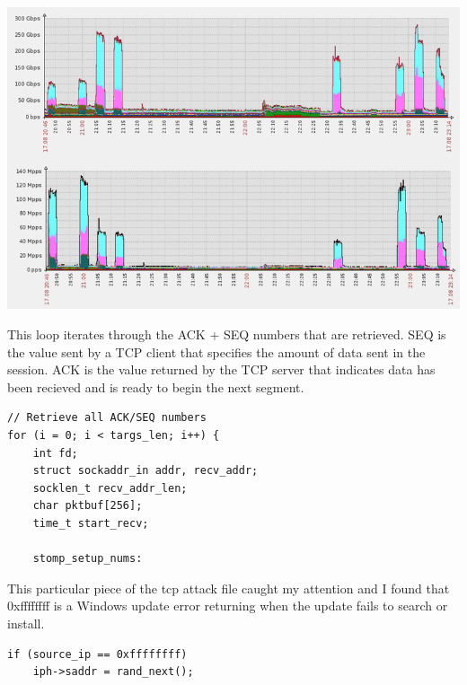 \documentclass[12pt, letterpaper]{article}
\begin{document}
\begin{sloppypar}
\begin{flushleft}
\begin{center}
{\includegraphics[width=1.0\textwidth]{mirai-bandwidth.png}}
\end{center}

This loop iterates through the ACK + SEQ numbers that are retrieved. SEQ is the value
sent by a TCP client that specifies the amount of data sent in the session. ACK is the 
value returned by the TCP server that indicates data has been recieved and is ready to
begin the next segment. 

\begin{lstlisting}
// Retrieve all ACK/SEQ numbers
for (i = 0; i < targs_len; i++) {
    int fd;
    struct sockaddr_in addr, recv_addr;
    socklen_t recv_addr_len;
    char pktbuf[256];
    time_t start_recv;

    stomp_setup_nums:
\end{lstlisting}

This particular piece of the tcp attack file caught my attention and I found
that 0xffffffff is a Windows update error returning when the update fails to search 
or install. 

\begin{lstlisting}
if (source_ip == 0xffffffff)
	iph->saddr = rand_next();
\end{lstlisting}

\newpage


\end{flushleft}
\end{sloppypar}
\end{document}
